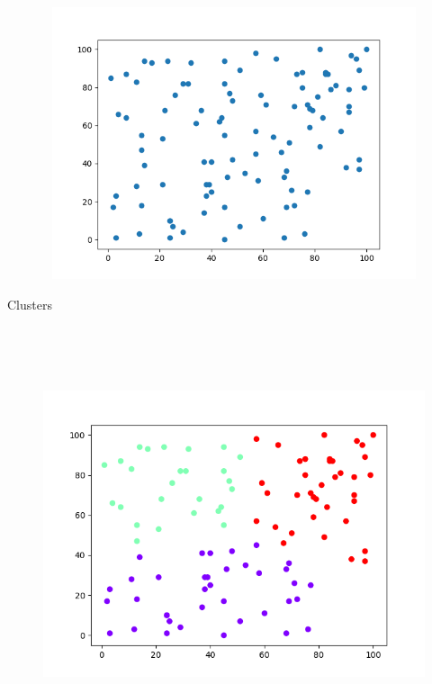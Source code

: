 \documentclass[12pt]{article}
\renewcommand{\_}{\kern-1.5pt\textunderscore\kern-1.5pt}
\begin{document}
\begin{figure}[H]
	\begin{Center}
		\includegraphics[width=6.4in,height=3.15in]{./media/image15.png}
	\end{Center}
\end{figure}



\par

{\fontsize{14pt}{16.8pt} Clusters\par}\par




\begin{figure}[H]
	\begin{Center}
		\includegraphics[width=6.4in,height=4.8in]{./media/image16.png}
	\end{Center}
\end{figure}
\end{document}
